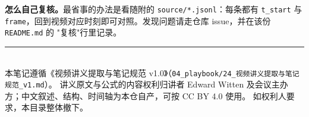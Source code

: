 \documentclass[11pt,a4paper]{ctexart}
\begin{document}
\textbf{怎么自己复核。}最省事的办法是看随附的 \texttt{source/*.jsonl}：每条都有 \texttt{t\_start} 与
\texttt{frame}，回到视频对应时刻即可对照。发现问题请走仓库 issue，并在该份 \texttt{README.md} 的
"复核"行里记录。

\vfill
\noindent\rule{\textwidth}{0.4pt}\\[2pt]
{\footnotesize 本笔记遵循《视频讲义提取与笔记规范 v1.0》（\texttt{04\_playbook/24\_视频讲义提取与笔记规范\_v1.md}）。
讲义原文与公式的内容权利归讲者 Edward Witten 及会议主办方；中文叙述、结构、时间轴为本仓自产，可按 CC BY 4.0 使用。
如权利人要求，本目录整体撤下。}
\end{document}
